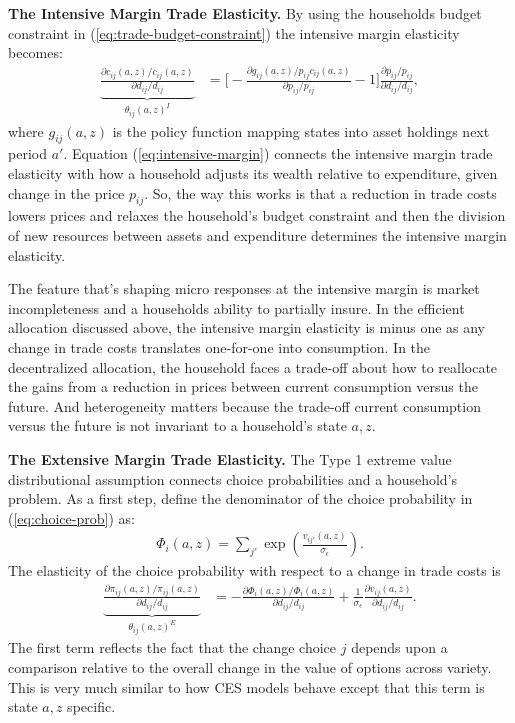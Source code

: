 \documentclass[12pt,pdftex]{article}
\begin{document}
\begin{onehalfspacing}
\textbf{The Intensive Margin Trade Elasticity.} By using the households budget constraint in (\ref{eq:trade-budget-constraint}) the intensive margin elasticity becomes:
\begin{align}
\underbrace{\frac{\partial c_{ij}(a,z)/ c_{ij}(a,z)}{\partial d_{ij} / d_{ij}}}_{\theta_{ij}(a,z)^{I}} &= \bigg [-\frac{\partial g_{ij}(a,z)/ p_{ij}c_{ij}(a,z)}{\partial p_{ij}/ p_{ij}} - 1 \bigg ]\frac{\partial p_{ij}/p_{ij}}{\partial d_{ij}/ d_{ij}} ,
\label{eq:intensive-margin}
\end{align}
where $g_{ij}(a,z)$ is the policy function mapping states into asset holdings next period $a'$. Equation (\ref{eq:intensive-margin}) connects the intensive margin trade elasticity with how a household adjusts its wealth relative to expenditure, given change in the price $p_{ij}$. So, the way this works is that a reduction in trade costs lowers prices and relaxes the household's budget constraint and then the division of new resources between assets and expenditure determines the intensive margin elasticity.

The feature that's shaping micro responses at the intensive margin is market incompleteness and a households ability to partially insure. In the efficient allocation discussed above, the intensive margin elasticity is minus one as any change in trade costs translates one-for-one into consumption. In the decentralized allocation, the household faces a trade-off about how to reallocate the gains from a reduction in prices between current consumption versus the future. And heterogeneity matters because the trade-off current consumption versus the future is not invariant to a household's state $a, z$.

\textbf{The Extensive Margin Trade Elasticity.} The Type 1 extreme value distributional assumption connects choice probabilities and a household's problem. As a first step, define the denominator of the choice probability in (\ref{eq:choice-prob}) as:
\begin{align}
\Phi_{i}(a,z) = \sum_{j'} \exp \left( \frac{ v_{ij'}(a, z) }{\sigma_{\epsilon}} \right).
\end{align}
The elasticity of the choice probability with respect to a change in trade costs is
\begin{align}
\underbrace{ \frac{\partial \pi_{ij}(a,z) / \pi_{ij}(a,z)}{\partial d_{ij} / d_{ij}} }_{\theta_{ij}(a,z)^{E}} &= - \frac{\partial \Phi_{i}(a,z) / \Phi_{i}(a,z)}{\partial d_{ij}/d_{ij}} + \frac{1}{\sigma_{\epsilon}}\frac{\partial v_{ij}(a,z)}{\partial d_{ij}/d_{ij}} .
\label{eq:extensive-margin}
\end{align}
The first term reflects the fact that the change choice $j$ depends upon a comparison relative to the overall change in the value of options across variety. This is very much similar to how CES models behave except that this term is state $a,z$ specific.


\end{onehalfspacing}
\end{document}
